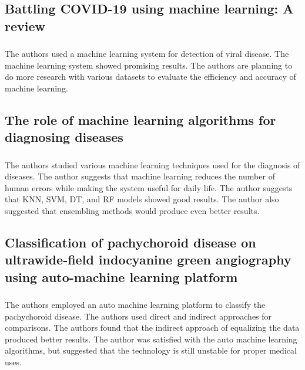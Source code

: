 \subsection{Battling COVID-19 using machine learning: A review}
\subsubsection{\citeauthor*{ref_paper_20} \citeyearpar{ref_paper_20}}

The authors used a machine learning system for detection of viral disease. The machine learning system showed promising results. The authors are planning to do more research with various datasets to evaluate the efficiency and accuracy of machine learning.

\subsection{The role of machine learning algorithms for diagnosing diseases}
\subsubsection{\citeauthor*{ref_paper_11} \citeyearpar{ref_paper_11}}

The authors studied various machine learning techniques used for the diagnosis of diseases. The author suggests that machine learning reduces the number of human errors while making the system useful for daily life. The author suggests that KNN, SVM, DT, and RF models showed good results. The author also suggested that ensembling methods would produce even better results.

\subsection{Classification of pachychoroid disease on ultrawide-field indocyanine green angiography using auto-machine learning platform}
\subsubsection{\citeauthor*{ref_paper_8} \citeyearpar{ref_paper_8}}

The authors employed an auto machine learning platform to classify the pachychoroid disease. The authors used direct and indirect approaches for comparisons. The authors found that the indirect approach of equalizing the data produced better results. The author was satisfied with the auto machine learning algorithms, but suggested that the technology is still unstable for proper medical uses.

